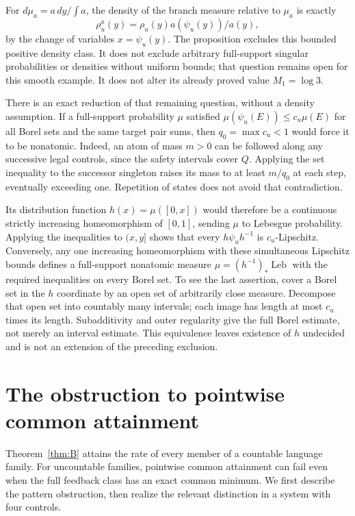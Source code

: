 \documentclass[11pt,reqno]{amsart}
\numberwithin{equation}{section}
\theoremstyle{definition}
\theoremstyle{definition}
\newcommand{\Leb}{\operatorname{Leb}}
\begin{document}
For $d\mu_a=a\,dy/\int a$, the density of the branch measure
relative to $\mu_a$ is exactly
\[
 \rho_u^a(y)=\rho_u(y)a(\psi_u(y))/a(y),
\]
by the change of variables
$x=\psi_u(y)$. The proposition excludes this bounded positive
density class. It does not exclude arbitrary full-support singular
probabilities or densities without uniform bounds; that question
remains open for this smooth example. It does not alter its already
proved value $M_1=\log3$.

There is an exact reduction of that remaining question, without a
density assumption. If a full-support probability $\mu$ satisfied
$\mu(\psi_u(E))\le c_u\mu(E)$ for all Borel sets and the
same target pair sums, then $q_0=\max c_u<1$ would force it to
be nonatomic. Indeed, an atom of mass $m>0$ can be followed along
any successive legal controls, since the safety intervals cover
$Q$. Applying the set inequality to the successor singleton raises
its mass to at least $m/q_0$ at each step, eventually exceeding
one. Repetition of states does not avoid that contradiction.

Its distribution function $h(x)=\mu([0,x])$ would therefore be a
continuous strictly increasing homeomorphism of $[0,1]$, sending
$\mu$ to Lebesgue probability. Applying the inequalities to
$(x,y]$ shows that every $h\psi_uh^{-1}$ is $c_u$-Lipschitz.
Conversely, any one increasing homeomorphism with these simultaneous
Lipschitz bounds defines a full-support nonatomic measure
$\mu=(h^{-1})_*\Leb$ with the required inequalities on every
Borel set. To see the last assertion, cover a Borel set in the
$h$ coordinate by an open set of arbitrarily close measure.
Decompose that open set into countably many intervals; each image
has length at most $c_u$ times its length. Subadditivity and
outer regularity give the full Borel estimate, not merely an
interval estimate. This equivalence leaves existence of $h$
undecided and is not an extension of the preceding exclusion.

\section{The obstruction to pointwise common attainment}
\label{app:pointwise}

Theorem~\ref{thm:B} attains the rate of every member of a countable
language family. For uncountable families, pointwise common
attainment can fail even when the full feedback class has an exact
common minimum. We first describe the pattern obstruction, then realize the relevant
distinction in a system with four controls.
\end{document}
